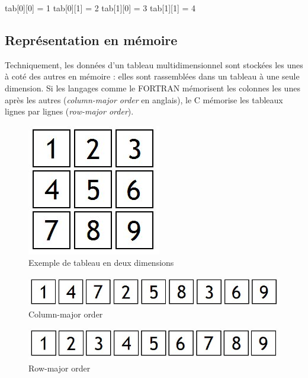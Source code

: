 \begin{C}
tab[0][0] = 1
tab[0][1] = 2
tab[1][0] = 3
tab[1][1] = 4
\end{C}

\subsection{Représentation en mémoire}
\label{representation-en-memoire-1 }

Techniquement, les données d'un tableau multidimensionnel sont stockées
les unes à coté des autres en mémoire : elles sont rassemblées dans un
tableau à une seule dimension. Si les langages comme le FORTRAN
mémorisent les colonnes les unes après les autres (\emph{column-major
order} en anglais), le C mémorise les tableaux lignes par lignes
(\emph{row-major order}).

\begin{figure}[htbp]
\centering
\includegraphics[scale=0.5]{images/tableau_2_dimension.jpg}
\caption{Exemple de tableau en deux dimensions}
\end{figure}

\begin{figure}[htbp]
\centering
\includegraphics[scale=0.5]{images/column_major_order.jpg}
\caption{Column-major order}
\end{figure}

\begin{figure}[htbp]
\centering
\includegraphics[scale=0.5]{images/row_major_order.jpg}
\caption{Row-major order}
\end{figure}

